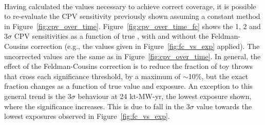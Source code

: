 \begin{figure*}[htbp]
  \centering
  \\
  \caption{Fraction of throws for which significance of DUNE's CP-violation test ($\deltacp \neq \{0,\pm\pi\}$) exceeds 1--3$\sigma$, calculated using constant-\dchisq (dashed lines) and \dchisqcrit values calculated using the Feldman-Cousins method (shaded histograms), as a function of the true value of \deltacp. Shown for NO, for a number of different exposures. The number of throws used to make each figure is also shown.}
  \label{fig:cpv_over_time_fc}
\end{figure*}
Having calculated the \dchisqcrit values necessary to achieve correct coverage, it is possible to re-evaluate the CPV sensitivity previously shown assuming a constant \dchisq method in Figure~\ref{fig:cpv_over_time}. Figure~\ref{fig:cpv_over_time_fc} shows the 1, 2 and 3$\sigma$ CPV sensitivities as a function of true \deltacp, with and without the Feldman-Cousins correction (e.g., the \dchisqcrit values given in Figure~\ref{fig:fc_vs_exp} applied). The uncorrected values are the same as in Figure~\ref{fig:cpv_over_time}. In general, the effect of the Feldman-Cousins correction is to reduce the fraction of toy throws that cross each significance threshold, by a maximum of $\sim$10\%, but the exact fraction changes as a function of true \deltacp value and exposure. An exception to this general trend is the 3$\sigma$ behaviour at 24 kt-MW-yr, the lowest exposure shown, where the significance increases. This is due to fall in the 3$\sigma$ \dchisqcrit value towards the lowest exposures observed in Figure~\ref{fig:fc_vs_exp}.

